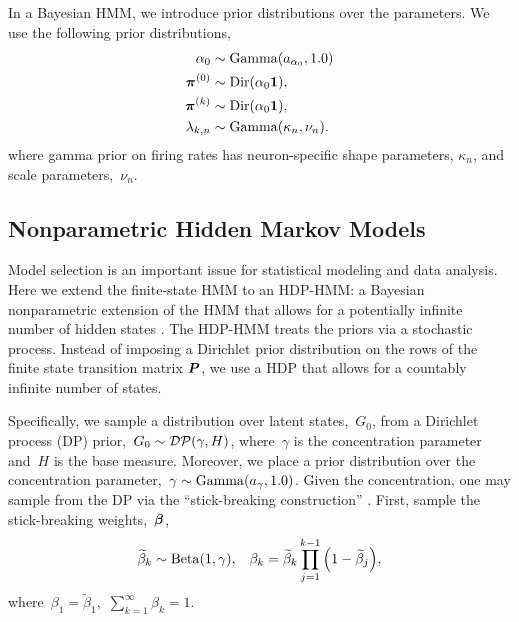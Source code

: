 
In a Bayesian HMM,  we introduce prior distributions over
the parameters. We use the following prior distributions,
\begin{align*}
  \alpha_0 &\sim \mathrm{Gamma}(a_{\alpha_0}, 1.0) \\
  \boldsymbol{\pi}^{(0)} &\sim \mathrm{Dir}(\alpha_0\boldsymbol{1}),\\
  \boldsymbol{\pi}^{(k)} &\sim \mathrm{Dir}(\alpha_0\boldsymbol{1}), \\
  \lambda_{k,n} &\sim \mathrm{Gamma}(\kappa_n,\nu_n).
\end{align*}
where gamma prior on firing rates has neuron-specific shape parameters,
$\kappa_n$, and scale parameters,~$\nu_n$.

\subsection{Nonparametric Hidden Markov Models}

Model selection is an important issue for statistical modeling and
data analysis.  Here we extend the finite-state HMM to an
HDP-HMM: a Bayesian nonparametric extension of the HMM that allows for
a potentially infinite number of hidden states \citep{Teh06,
  Beal02}. The HDP-HMM treats the priors via a stochastic
process. Instead of imposing a Dirichlet prior distribution on the
rows of the finite state transition matrix $\boldsymbol{P}$, we use a HDP that
allows for a countably infinite number of states.

Specifically, we sample a distribution over latent states,~$G_0$, from
a Dirichlet process (DP) \citep{Ferguson73}
prior,~${G_0\sim \mathcal{DP}(\gamma,H)}$, where~$\gamma$ is the
concentration parameter and~$H$ is the base measure.  Moreover, we
place a prior distribution over the concentration parameter,~${\gamma
\sim \mathrm{Gamma}(a_{\gamma}, 1.0)}$.  Given the concentration, one may
sample from the DP via the ``stick-breaking construction''
\citep{Sethuraman94}. First, sample the stick-breaking
weights,~$\boldsymbol{\beta}$,
\begin{eqnarray}                                   
\widetilde{\beta}_{k}\sim \mathrm{Beta}(1,\gamma), \;\;\; 
\beta_{k}=\widetilde{\beta}_{k}\prod_{j=1}^{k-1}\Big(1-\widetilde{\beta}_{j}\Big),
\label{stick1}
\end{eqnarray}
where~$\beta_1 = \widetilde{\beta}_1$,~$\sum_{k=1}^\infty \beta_{k}=1$.


